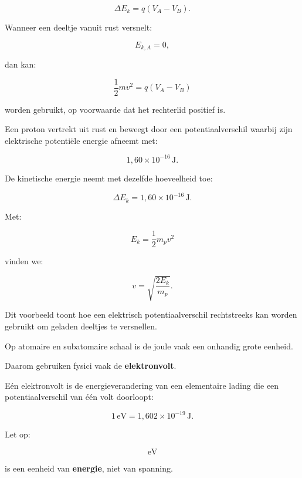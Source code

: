 \documentclass{ximera}
\begin{document}
\[
\boxed{
\Delta E_k
=
q(V_A-V_B).
}
\]


Wanneer een deeltje vanuit rust versnelt:

\[
E_{k,A}=0,
\]

dan kan:

\[
\frac12mv^2
=
q(V_A-V_B)
\]

worden gebruikt, op voorwaarde dat het rechterlid positief is.



\begin{voorbeeld}

Een proton vertrekt uit rust en beweegt door een potentiaalverschil
waarbij zijn elektrische potentiële energie afneemt met:

\[
1{,}60\times10^{-16}\,\mathrm J.
\]

De kinetische energie neemt met dezelfde hoeveelheid toe:

\[
\Delta E_k
=
1{,}60\times10^{-16}\,\mathrm J.
\]

Met:

\[
E_k=\frac12m_pv^2
\]

vinden we:

\[
v
=
\sqrt{
\frac{2E_k}{m_p}
}.
\]

Dit voorbeeld toont hoe een elektrisch potentiaalverschil rechtstreeks
kan worden gebruikt om geladen deeltjes te versnellen.

\end{voorbeeld}




Op atomaire en subatomaire schaal is de joule vaak een onhandig grote
eenheid.

Daarom gebruiken fysici vaak de \textbf{elektronvolt}.

Eén elektronvolt is de energieverandering van een elementaire lading
die een potentiaalverschil van één volt doorloopt:

\[
\boxed{
1\,\mathrm{eV}
=
1{,}602\times10^{-19}\,\mathrm J.
}
\]

Let op:

\[
\mathrm{eV}
\]

is een eenheid van \textbf{energie}, niet van spanning.
\end{document}
